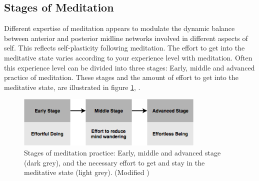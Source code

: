 \subsection{Stages of Meditation}
Different expertise of meditation appears to modulate the dynamic balance between anterior and posterior midline networks involved in different aspects of self. This reflects self-plasticity following meditation. 
The effort to get into the meditative state varies according to your experience level with meditation. Often this experience level can be divided into three stages: Early, middle and advanced practice of meditation. These stages and the amount of effort to get into the meditative state, are illustrated in figure \ref{fig:meditation_stages}, . \cite{Tang2017} 

\begin{figure}[H]
\includegraphics[width=0.8\textwidth]{figures/stages_of_meditation.png} 
\caption{Stages of meditation practice: Early, middle and advanced stage (dark grey), and the necessary effort to get and stay in the meditative state (light grey). (Modified \cite{Tang2017})}
	\label{fig:meditation_stages}  
\end{figure}  





